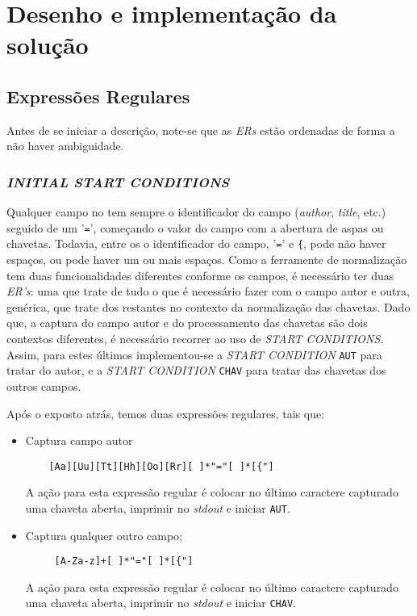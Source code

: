 \section{Desenho e implementação da solução}
\label{sec:des:b1}


\subsection{Expressões Regulares}

Antes de se iniciar a descrição, note-se que as \emph{ERs} estão ordenadas de
forma a não haver ambiguidade. 

\subsubsection{\emph{INITIAL \emph{START CONDITIONS}}}


Qualquer campo no  tem sempre o identificador do campo
(\emph{author}, \emph{title}, etc.) seguido de um '\texttt{=}', começando
o valor do campo com a abertura de aspas ou chavetas. Todavia, entre os
o identificador do campo, '\texttt{=}' e \texttt{\{}, pode não haver espaços, ou
pode haver um ou mais espaços. Como a ferramente de normalização tem duas
funcionalidades diferentes conforme os campos, é necessário ter duas
\emph{ER's}: uma que trate de tudo o que é necessário fazer com o campo autor
e outra, genérica, que trate dos restantes no contexto da normalização das
chavetas. Dado que, a captura do campo autor e do processamento das chavetas são
dois contextos diferentes, é necessário recorrer ao uso de \emph{START
CONDITIONS}. Assim, para estes últimos implementou-se a \emph{START 
CONDITION} \texttt{AUT} para tratar do autor, e a \emph{START
CONDITION} \texttt{CHAV} para tratar das chavetas dos outros campos.


Após o exposto atrás, temos duas expressões regulares, tais que:

\begin{itemize}
  \item Captura campo autor
\begin{verbatim}
    [Aa][Uu][Tt][Hh][Oo][Rr][ ]*"="[ ]*[{"]
\end{verbatim}
A ação para esta expressão regular é colocar no último caractere capturado uma
chaveta aberta, imprimir no \emph{stdout} e iniciar \texttt{AUT}.
    

  \item Captura qualquer outro campo;
\begin{verbatim}
     [A-Za-z]+[ ]*"="[ ]*[{"]
\end{verbatim}
A ação para esta expressão regular é colocar no último caractere capturado uma
chaveta aberta, imprimir no \emph{stdout} e iniciar \texttt{CHAV}.
\end{itemize}


